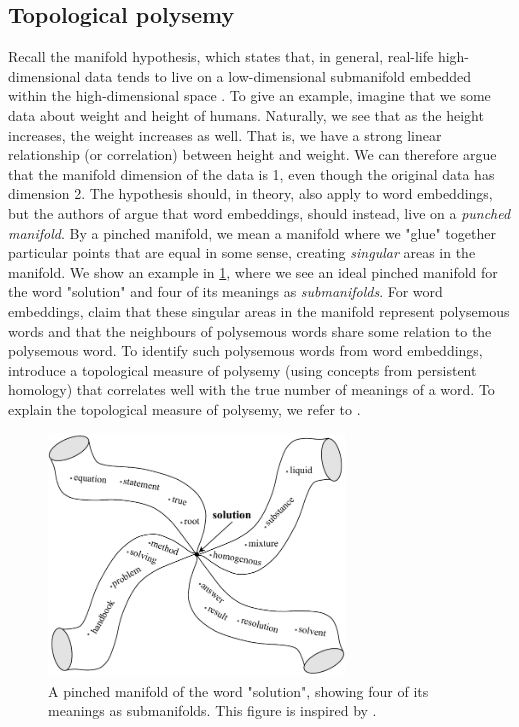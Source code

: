 \subsection{Topological polysemy}
\label{sec:topological-polysemy}
Recall the manifold hypothesis, which states that, in general, real-life high-dimensional data tends to live on a low-dimensional submanifold embedded within the high-dimensional space \cite[p. 16]{bengio2014representation}. To give an example, imagine that we some data about weight and height of humans. Naturally, we see that as the height increases, the weight increases as well. That is, we have a strong linear relationship (or correlation) between height and weight. We can therefore argue that the manifold dimension of the data is 1, even though the original data has dimension 2. The hypothesis should, in theory, also apply to word embeddings, but the authors of \cite{jakubowski2020topology} argue that word embeddings, should instead, live on a \textit{punched manifold}. By a pinched manifold, we mean a manifold where we "glue" together particular points that are equal in some sense, creating \textit{singular} areas in the manifold. We show an example in \cref{fig:pinched-manifold}, where we see an ideal pinched manifold for the word "solution" and four of its meanings as \textit{submanifolds}. For word embeddings, \cite{jakubowski2020topology} claim that these singular areas in the manifold represent polysemous words and that the neighbours of polysemous words share some relation to the polysemous word. To identify such polysemous words from word embeddings, \cite{jakubowski2020topology} introduce a topological measure of polysemy (using concepts from persistent homology) that correlates well with the true number of meanings of a word. To explain the topological measure of polysemy, we refer to \cite{jakubowski2020topology}.
\begin{figure}[H]
    \centering
    \includegraphics[width=0.7\textwidth]{thesis/figures/pinched-manifold_cropped.pdf}
    \caption{A pinched manifold of the word "solution", showing four of its meanings as submanifolds. This figure is inspired by \cite[Figure 5]{jakubowski2020topology}.}
    \label{fig:pinched-manifold}
\end{figure}

